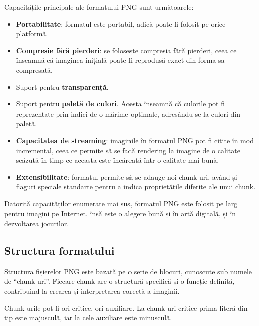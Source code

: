 \documentclass[a4paper,12pt]{report}
\begin{document}
Capacitățile principale ale formatului \ac{PNG} sunt următoarele:
\begin{itemize}
  \item 
  \textbf{Portabilitate}: formatul este portabil, adică poate fi folosit pe orice platformă.

  \item 
  \textbf{Compresie fără pierderi}: se folosește compresia fără pierderi,
  ceea ce înseamnă că imaginea inițială poate fi reprodusă exact din forma sa compresată.

  \item
  Suport pentru \textbf{transparență}.

  \item
  Suport pentru \textbf{paletă de culori}.
  Acesta înseamnă că culorile pot fi reprezentate prin indici de o mărime optimale,
  adresându-se la culori din paletă.
  
  \item
  \textbf{Capacitatea de streaming}: imaginile în formatul \ac{PNG} pot fi citite în mod incremental,
  ceea ce permite să se facă rendering la imagine de o calitate scăzută în timp ce 
  aceasta este încărcată într-o calitate mai bună.

  \item
  \textbf{Extensibilitate}: formatul permite să se adauge noi chunk-uri,
  având și flaguri speciale standarte pentru a indica proprietățile diferite ale unui chunk.
\end{itemize}

Datorită capacităților enumerate mai sus, formatul \ac{PNG} este folosit
pe larg pentru imagini pe Internet,
însă este o alegere bună și în artă digitală, și în dezvoltarea jocurilor.


\subsection{Structura formatului}

Structura fișierelor \ac{PNG} este bazată pe o serie de blocuri,
cunoscute sub numele de ``chunk-uri''.
Fiecare chunk are o structură specifică și o funcție definită,
contribuind la crearea și interpretarea corectă a imaginii.

Chunk-urile pot fi ori critice, ori auxiliare.
La chunk-uri critice prima literă din tip este majusculă,
iar la cele auxiliare este minusculă.
\end{document}
